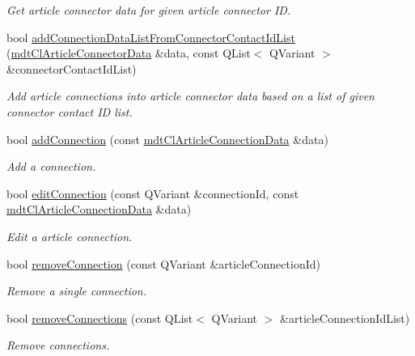 \begin{DoxyCompactItemize}
\begin{DoxyCompactList}\small\item\em Get article connector data for given article connector I\-D. \end{DoxyCompactList}\item 
bool \hyperlink{classmdt_cl_article_a21287f0dd3802c24e85a26d8f4cad750}{add\-Connection\-Data\-List\-From\-Connector\-Contact\-Id\-List} (\hyperlink{classmdt_cl_article_connector_data}{mdt\-Cl\-Article\-Connector\-Data} \&data, const Q\-List$<$ Q\-Variant $>$ \&connector\-Contact\-Id\-List)
\begin{DoxyCompactList}\small\item\em Add article connections into article connector data based on a list of given connector contact I\-D list. \end{DoxyCompactList}\item 
bool \hyperlink{classmdt_cl_article_a47317fd8f54e5105c273ba6946eb18be}{add\-Connection} (const \hyperlink{classmdt_cl_article_connection_data}{mdt\-Cl\-Article\-Connection\-Data} \&data)
\begin{DoxyCompactList}\small\item\em Add a connection. \end{DoxyCompactList}\item 
bool \hyperlink{classmdt_cl_article_add1dafdef4f6195860eed12c8722ff66}{edit\-Connection} (const Q\-Variant \&connection\-Id, const \hyperlink{classmdt_cl_article_connection_data}{mdt\-Cl\-Article\-Connection\-Data} \&data)
\begin{DoxyCompactList}\small\item\em Edit a article connection. \end{DoxyCompactList}\item 
bool \hyperlink{classmdt_cl_article_a1797f448906bd064ae53c001f874d670}{remove\-Connection} (const Q\-Variant \&article\-Connection\-Id)
\begin{DoxyCompactList}\small\item\em Remove a single connection. \end{DoxyCompactList}\item 
bool \hyperlink{classmdt_cl_article_a6b3ea8c5ba48000f791afd7da8bb5250}{remove\-Connections} (const Q\-List$<$ Q\-Variant $>$ \&article\-Connection\-Id\-List)
\begin{DoxyCompactList}\small\item\em Remove connections. \end{DoxyCompactList}\item 

\end{DoxyCompactItemize}
